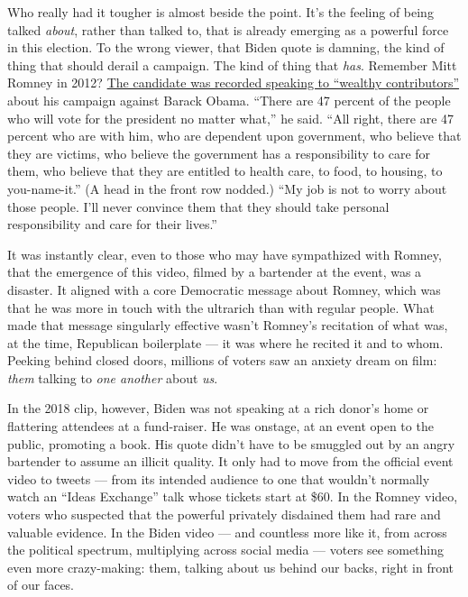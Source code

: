 Who really had it tougher is almost beside the point. It's the feeling
of being talked \emph{about}, rather than talked to, that is already
emerging as a powerful force in this election. To the wrong viewer, that
Biden quote is damning, the kind of thing that should derail a campaign.
The kind of thing that \emph{has}. Remember Mitt Romney in 2012?
\href{https://www.motherjones.com/politics/2012/09/secret-video-romney-private-fundraiser/}{The
candidate was recorded speaking to ``wealthy contributors''} about his
campaign against Barack Obama. ``There are 47 percent of the people who
will vote for the president no matter what,'' he said. ``All right,
there are 47 percent who are with him, who are dependent upon
government, who believe that they are victims, who believe the
government has a responsibility to care for them, who believe that they
are entitled to health care, to food, to housing, to you-name-it.'' (A
head in the front row nodded.) ``My job is not to worry about those
people. I'll never convince them that they should take personal
responsibility and care for their lives.''

It was instantly clear, even to those who may have sympathized with
Romney, that the emergence of this video, filmed by a bartender at the
event, was a disaster. It aligned with a core Democratic message about
Romney, which was that he was more in touch with the ultrarich than with
regular people. What made that message singularly effective wasn't
Romney's recitation of what was, at the time, Republican boilerplate ---
it was where he recited it and to whom. Peeking behind closed doors,
millions of voters saw an anxiety dream on film: \emph{them} talking to
\emph{one another} about \emph{us}.

In the 2018 clip, however, Biden was not speaking at a rich donor's home
or flattering attendees at a fund-raiser. He was onstage, at an event
open to the public, promoting a book. His quote didn't have to be
smuggled out by an angry bartender to assume an illicit quality. It only
had to move from the official event video to tweets --- from its
intended audience to one that wouldn't normally watch an ``Ideas
Exchange'' talk whose tickets start at \$60. In the Romney video, voters
who suspected that the powerful privately disdained them had rare and
valuable evidence. In the Biden video --- and countless more like it,
from across the political spectrum, multiplying across social media ---
voters see something even more crazy-making: them, talking about us
behind our backs, right in front of our faces.

